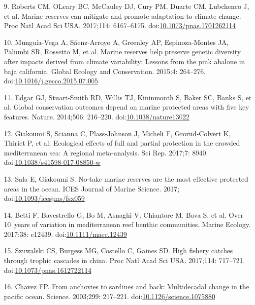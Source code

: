 \documentclass[12pt,]{article}
\begin{document}
\hypertarget{ref-roberts_2017-J9}{}
9. Roberts CM, OLeary BC, McCauley DJ, Cury PM, Duarte CM, Lubchenco J,
et al. Marine reserves can mitigate and promote adaptation to climate
change. Proc Natl Acad Sci USA. 2017;114: 6167--6175.
doi:\href{https://doi.org/10.1073/pnas.1701262114}{10.1073/pnas.1701262114}

\hypertarget{ref-munguavega_2015-yg}{}
10. Munguía-Vega A, Sáenz-Arroyo A, Greenley AP, Espinoza-Montes JA,
Palumbi SR, Rossetto M, et al. Marine reserves help preserve genetic
diversity after impacts derived from climate variability: Lessons from
the pink abalone in baja california. Global Ecology and Conservation.
2015;4: 264--276.
doi:\href{https://doi.org/10.1016/j.gecco.2015.07.005}{10.1016/j.gecco.2015.07.005}

\hypertarget{ref-edgar_2014-UO}{}
11. Edgar GJ, Stuart-Smith RD, Willis TJ, Kininmonth S, Baker SC, Banks
S, et al. Global conservation outcomes depend on marine protected areas
with five key features. Nature. 2014;506: 216--220.
doi:\href{https://doi.org/10.1038/nature13022}{10.1038/nature13022}

\hypertarget{ref-giakoumi_2017-V2}{}
12. Giakoumi S, Scianna C, Plass-Johnson J, Micheli F, Grorud-Colvert K,
Thiriet P, et al. Ecological effects of full and partial protection in
the crowded mediterranean sea: A regional meta-analysis. Sci Rep.
2017;7: 8940.
doi:\href{https://doi.org/10.1038/s41598-017-08850-w}{10.1038/s41598-017-08850-w}

\hypertarget{ref-sala_2017-69}{}
13. Sala E, Giakoumi S. No-take marine reserves are the most effective
protected areas in the ocean. ICES Journal of Marine Science. 2017;
doi:\href{https://doi.org/10.1093/icesjms/fsx059}{10.1093/icesjms/fsx059}

\hypertarget{ref-betti_2017-lq}{}
14. Betti F, Bavestrello G, Bo M, Asnaghi V, Chiantore M, Bava S, et al.
Over 10~years of variation in mediterranean reef benthic communities.
Marine Ecology. 2017;38: e12439.
doi:\href{https://doi.org/10.1111/maec.12439}{10.1111/maec.12439}

\hypertarget{ref-szuwalski_2017-jc}{}
15. Szuwalski CS, Burgess MG, Costello C, Gaines SD. High fishery
catches through trophic cascades in china. Proc Natl Acad Sci USA.
2017;114: 717--721.
doi:\href{https://doi.org/10.1073/pnas.1612722114}{10.1073/pnas.1612722114}

\hypertarget{ref-chavez_2003-_m}{}
16. Chavez FP. From anchovies to sardines and back: Multidecadal change
in the pacific ocean. Science. 2003;299: 217--221.
doi:\href{https://doi.org/10.1126/science.1075880}{10.1126/science.1075880}
\end{document}
